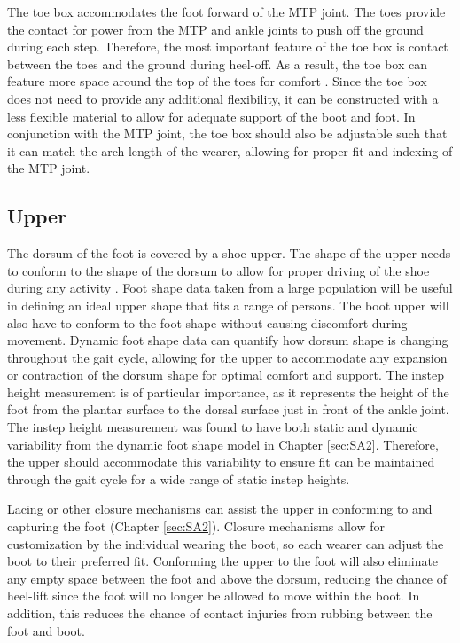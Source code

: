 \documentclass[defaultstyle,11pt]{thesis}
\begin{document}
The toe box accommodates the foot forward of the MTP joint.
The toes provide the contact for power from the MTP and ankle joints to push off the ground during each step.
Therefore, the most important feature of the toe box is contact between the toes and the ground during heel-off.
As a result, the toe box can feature more space around the top of the toes for comfort \citep{Luximon2009}.
Since the toe box does not need to provide any additional flexibility, it can be constructed with a less flexible material to allow for adequate support of the boot and foot.
In conjunction with the MTP joint, the toe box should also be adjustable such that it can match the arch length of the wearer, allowing for proper fit and indexing of the MTP joint.

\hypertarget{upper}{%
\subsection{Upper}\label{upper}}

The dorsum of the foot is covered by a shoe upper.
The shape of the upper needs to conform to the shape of the dorsum to allow for proper driving of the shoe during any activity \citep{Feeney2019}.
Foot shape data taken from a large population will be useful in defining an ideal upper shape that fits a range of persons.
The boot upper will also have to conform to the foot shape without causing discomfort during movement.
Dynamic foot shape data can quantify how dorsum shape is changing throughout the gait cycle, allowing for the upper to accommodate any expansion or contraction of the dorsum shape for optimal comfort and support.
The instep height measurement is of particular importance, as it represents the height of the foot from the plantar surface to the dorsal surface just in front of the ankle joint.
The instep height measurement was found to have both static and dynamic variability from the dynamic foot shape model in Chapter \ref{sec:SA2}.
Therefore, the upper should accommodate this variability to ensure fit can be maintained through the gait cycle for a wide range of static instep heights.

Lacing or other closure mechanisms can assist the upper in conforming to and capturing the foot (Chapter \ref{sec:SA2}).
Closure mechanisms allow for customization by the individual wearing the boot, so each wearer can adjust the boot to their preferred fit.
Conforming the upper to the foot will also eliminate any empty space between the foot and above the dorsum, reducing the chance of heel-lift since the foot will no longer be allowed to move within the boot.
In addition, this reduces the chance of contact injuries from rubbing between the foot and boot.
\end{document}
